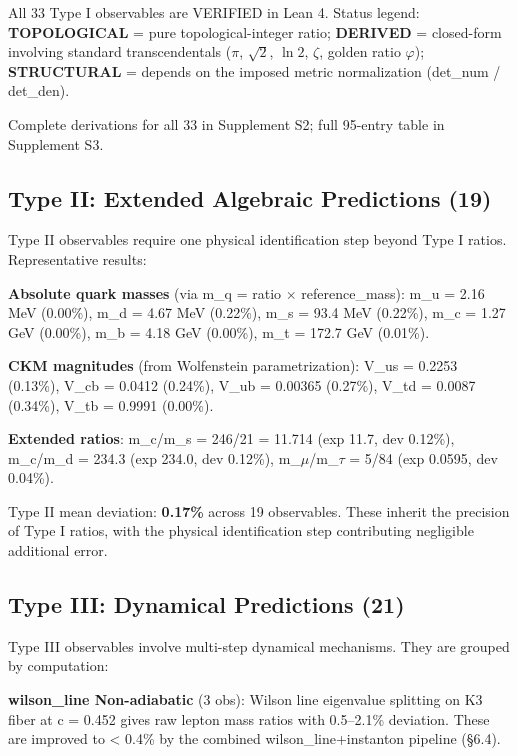 \documentclass[11pt,a4paper]{article}
\begin{document}
All 33 Type I observables are VERIFIED in Lean 4. Status legend: \textbf{TOPOLOGICAL} = pure topological-integer ratio; \textbf{DERIVED} = closed-form involving standard transcendentals (\(\pi\), \(\sqrt{2}\), \(\ln 2\), \(\zeta\), golden ratio \(\varphi\)); \textbf{STRUCTURAL} = depends on the imposed metric normalization (det\_num / det\_den).

Complete derivations for all 33 in Supplement S2; full 95-entry table in
Supplement S3.

\subsection{Type II: Extended Algebraic Predictions (19)}

Type II observables require one physical identification step beyond Type
I ratios. Representative results:

\textbf{Absolute quark masses} (via m\_q = ratio \(\times\)
reference\_mass): m\_u = 2.16 MeV (0.00\%), m\_d = 4.67 MeV (0.22\%),
m\_s = 93.4 MeV (0.22\%), m\_c = 1.27 GeV (0.00\%), m\_b = 4.18 GeV
(0.00\%), m\_t = 172.7 GeV (0.01\%).

\textbf{CKM magnitudes} (from Wolfenstein parametrization):
\textbar V\_us\textbar{} = 0.2253 (0.13\%), \textbar V\_cb\textbar{} =
0.0412 (0.24\%), \textbar V\_ub\textbar{} = 0.00365 (0.27\%),
\textbar V\_td\textbar{} = 0.0087 (0.34\%), \textbar V\_tb\textbar{} =
0.9991 (0.00\%).

\textbf{Extended ratios}: m\_c/m\_s = 246/21 = 11.714 (exp 11.7, dev
0.12\%), m\_c/m\_d = 234.3 (exp 234.0, dev 0.12\%),
m\_\(\mu\)/m\_\(\tau\) = 5/84 (exp 0.0595, dev 0.04\%).

Type II mean deviation: \textbf{0.17\%} across 19 observables. These
inherit the precision of Type I ratios, with the physical identification
step contributing negligible additional error.

\subsection{Type III: Dynamical Predictions (21)}

Type III observables involve multi-step dynamical mechanisms. They are
grouped by computation:

\textbf{wilson\_line Non-adiabatic} (3 obs): Wilson line eigenvalue
splitting on K3 fiber at c = 0.452 gives raw lepton mass ratios with
0.5--2.1\% deviation. These are improved to \textless{} 0.4\% by the
combined wilson\_line+instanton pipeline (§6.4).
\end{document}
